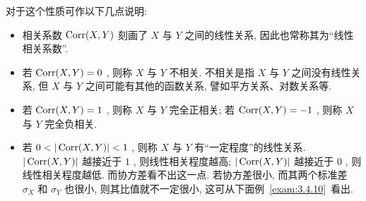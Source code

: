 	对于这个性质可作以下几点说明:
	\begin{itemize}
			\item 相关系数 $\operatorname{Corr}(X,Y)$ 刻画了 $X$ 与 $Y$ 之间的线性关系, 因此也常称其为“线性相关系数”.
			\item 若 $\operatorname{Corr}(X,Y)=0$ , 则称 $X$ 与 $Y$ 不相关. 不相关是指 $X$ 与 $Y$ 之间没有线性关系, 但 $X$ 与 $Y$ 之间可能有其他的函数关系, 譬如平方关系、对数关系等.
			\item 若 $\operatorname{Corr}(X,Y)=1$ , 则称 $X$ 与 $Y$ 完全正相关; 若 $\operatorname{Corr}(X,Y)=-1$ , 则称 $X$ 与 $Y$ 完全负相关.
			\item 若 $0<|\Corr(X,Y)|<1$ , 则称 $X$ 与 $Y$ 有“一定程度”的线性关系. $|\operatorname{Corr}(X,Y)|$ 越接近于 $1$ , 则线性相关程度越高; $|\operatorname{Corr}(X,Y)|$ 越接近于 $0$ , 则线性相关程度越低. 而协方差看不出这一点. 若协方差很小, 而其两个标准差 $\sigma_{X}$ 和 $\sigma_{Y}$ 也很小, 则其比值就不一定很小, 这可从下面例~\ref{exam:3.4.10}~看出.
	\end{itemize}
